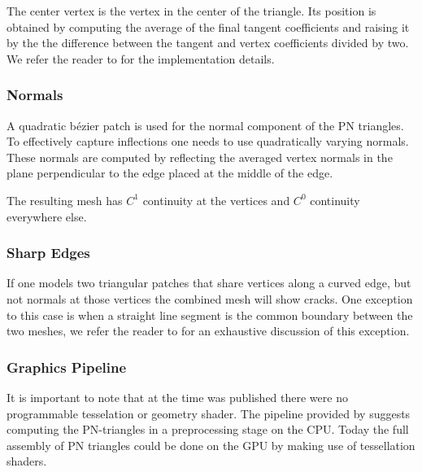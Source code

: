 The center vertex is the vertex in the center of the triangle. Its position is obtained by computing the average of the final tangent coefficients and raising it by the the difference between the tangent and vertex coefficients divided by two. We refer the reader to \textcite{vlachos2001curved} for the implementation details.

\subsubsection*{Normals}
A quadratic b\'ezier patch is used for the normal component of the PN triangles. To effectively capture inflections one needs to use quadratically varying normals. These normals are computed by reflecting the averaged vertex normals in the plane perpendicular to the edge placed at the middle of the edge.

The resulting mesh has $C^1$ continuity at the vertices and $C^0$ continuity everywhere else. 

\subsubsection*{Sharp Edges}
If one models two triangular patches that share vertices along a curved edge, but not normals at those vertices the combined mesh will show cracks. One exception to this case is when a straight line segment is the common boundary between the two meshes, we refer the reader to \citeauthor{vlachos2001curved} for an exhaustive discussion of this exception.

\subsubsection*{Graphics Pipeline}
It is important to note that at the time \textcite{vlachos2001curved} was published there were no programmable tesselation or geometry shader. The pipeline provided by \citeauthor{vlachos2001curved} suggests computing the PN-triangles in a preprocessing stage on the CPU. Today the full assembly of PN triangles could be done on the GPU by making use of tessellation shaders.
